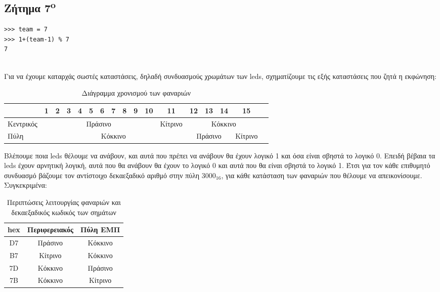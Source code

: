 \documentclass[a4paper,10pt]{article} \usepackage{anysize}
\begin{document}


\begin{minipage}{0.4\textwidth}
\begin{flushleft}
\section*{Ζήτημα 7\textsuperscript{o}}
\end{flushleft}
\end{minipage}
\begin{minipage}{0.3\textwidth}
\begin{flushright}
\begin{verbatim}
>>> team = 7
>>> 1+(team-1) % 7
7
\end{verbatim}
\end{flushright}
\end{minipage}\\[0.5cm]

Για να έχουμε καταρχάς σωστές καταστάσεις, δηλαδή συνδυασμούς χρωμάτων των
leds, σχηματίζουμε τις εξής καταστάσεις που ζητά η εκφώνηση: 

\begin{table}[h]
\centering
	\begin{tabular}{|l|c|c|c|c|c|c|c|c|c|c|c|c|c|c|c|c|}
	\hline
	& 1 & 2 & 3 & 4 & 5 & 6 & 7 & 8 & 9 & 10 & 11 & 12 & 13 & 14 & 15\\
	\hline
	Κεντρικός & \multicolumn{10}{c|}{\cellcolor{green}Πράσινο} &
	\cellcolor{yellow}Κίτρινο & \multicolumn{4}{c|}{\cellcolor{red}Κόκκινο}\\
	\hline
	Πύλη & \multicolumn{11}{c}{\cellcolor{red}Κόκκινο} &
	\multicolumn{3}{c|}{\cellcolor{green}Πράσινο} & \cellcolor{yellow}Κίτρινο\\
	\hline
	\end{tabular}
	\caption{Διάγραμμα χρονισμού των φαναριών}
\end{table}

Βλέπουμε ποια leds θέλουμε να ανάβουν, και αυτά που πρέπει να ανάβουν θα έχουν
λογικό 1 και όσα είναι σβηστά το λογικό 0. Επειδή βέβαια τα leds έχουν
αρνητική λογική, αυτά που θα ανάβουν θα έχουν το λογικό 0 και αυτά που θα
είναι σβηστά το λογικό 1. Έτσι για τον κάθε επιθυμητό συνδυασμό βάζουμε τον
αντίστοιχο δεκαεξαδικό αριθμό στην πύλη $3000_{16}$, για κάθε κατάσταση των
φαναριών που θέλουμε να απεικονίσουμε. Συγκεκριμένα:

\begin{table}[h]
\centering
	\begin{tabular}{|c|c|c|}
	\hline
	hex&Περιφερειακός & Πύλη ΕΜΠ\\
	\hline
	D7&\cellcolor{green}Πράσινο&\cellcolor{red}Κόκκινο\\
	\hline
	B7&\cellcolor{yellow}Κίτρινο&\cellcolor{red}Κόκκινο\\
	\hline
	7D&\cellcolor{red}Κόκκινο&\cellcolor{green}Πράσινο\\
	\hline
	7B&\cellcolor{red}Κόκκινο&\cellcolor{yellow}Κίτρινο\\
	\hline
	\end{tabular}
	\caption{Περιπτώσεις λειτουργίας φαναριών και δεκαεξαδικός κωδικός των
	σημάτων}
\end{table}
\end{document}
